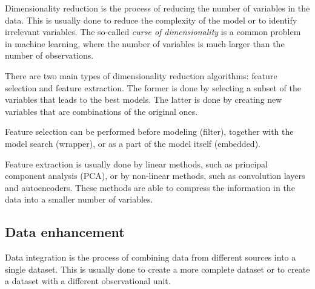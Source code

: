 Dimensionality reduction is the process of reducing the number of variables in the data.
This is usually done to reduce the complexity of the model or to identify irrelevant
variables.  The so-called \emph{curse of dimensionality} is a common problem in machine
learning, where the number of variables is much larger than the number of observations.

There are two main types of dimensionality reduction algorithms: feature selection and
feature extraction.  The former is done by selecting a subset of the variables that leads
to the best models.  The latter is done by creating new variables that are combinations
of the original ones.

Feature selection can be performed before modeling (filter), together with the model
search (wrapper), or as a part of the model itself (embedded).

Feature extraction is usually done by linear methods, such as principal component analysis
(PCA), or by non-linear methods, such as convolution layers and autoencoders.  These methods are able to
compress the information in the data into a smaller number of variables.



\subsection{Data enhancement}

Data integration is the process of combining data from different sources into a single
dataset.  This is usually done to create a more complete dataset or to create a dataset
with a different observational unit.


